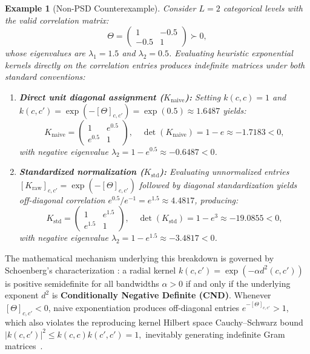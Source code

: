 \documentclass[default,sn-mathphys,Numbered]{sn-jnl}
\theoremstyle{thmstyleone}
\theoremstyle{thmstylethree}
\newtheorem{example}{Example}
\theoremstyle{thmstyletwo}
\begin{document}
\begin{example}[Non-PSD Counterexample]
\label{ex:non_psd_counterexample}
Consider $L = 2$ categorical levels with the valid correlation matrix:
\begin{equation}
\Theta = \begin{pmatrix} 1 & -0.5 \\ -0.5 & 1 \end{pmatrix} \succ 0,
\end{equation}
whose eigenvalues are $\lambda_1 = 1.5$ and $\lambda_2 = 0.5$. Evaluating heuristic exponential kernels directly on the correlation entries produces indefinite matrices under both standard conventions:
\begin{enumerate}
    \item \textbf{Direct unit diagonal assignment ($K_{\mathrm{naive}}$):} Setting $k(c, c) = 1$ and $k(c, c') = \exp(-[\Theta]_{c, c'}) = \exp(0.5) \approx 1.6487$ yields:
    \begin{equation}
    K_{\mathrm{naive}} = \begin{pmatrix} 1 & e^{0.5} \\ e^{0.5} & 1 \end{pmatrix}, \quad \det(K_{\mathrm{naive}}) = 1 - e \approx -1.7183 < 0,
    \end{equation}
    with negative eigenvalue $\lambda_2 = 1 - e^{0.5} \approx -0.6487 < 0$.
    \item \textbf{Standardized normalization ($K_{\mathrm{std}}$):} Evaluating unnormalized entries $[K_{\mathrm{raw}}]_{c, c'} = \exp(-[\Theta]_{c, c'})$  followed by diagonal standardization yields off-diagonal correlation $e^{0.5}/e^{-1} = e^{1.5} \approx 4.4817$, producing:
    \begin{equation}
    K_{\mathrm{std}} = \begin{pmatrix} 1 & e^{1.5} \\ e^{1.5} & 1 \end{pmatrix}, \quad \det(K_{\mathrm{std}}) = 1 - e^3 \approx -19.0855 < 0,
    \end{equation}
    with negative eigenvalue $\lambda_2 = 1 - e^{1.5} \approx -3.4817 < 0$.
\end{enumerate}
\end{example}

The mathematical mechanism underlying this breakdown is governed by Schoenberg's characterization \citep{schoenberg1938metric}: a radial kernel $k(c, c') = \exp(-\alpha d^2(c, c'))$ is positive semidefinite for all bandwidths $\alpha > 0$ if and only if the underlying exponent $d^2$ is \textbf{Conditionally Negative Definite (CND)}. Whenever $[\Theta]_{c, c'} < 0$, naive exponentiation produces off-diagonal entries $e^{-[\Theta]_{c, c'}} > 1$, which also violates the reproducing kernel Hilbert space Cauchy--Schwarz bound 
$|k(c, c')|^2 \le k(c, c) k(c', c') = 1,$
inevitably generating indefinite Gram matrices~\citep{saves2026hierarchical}.
\end{document}

